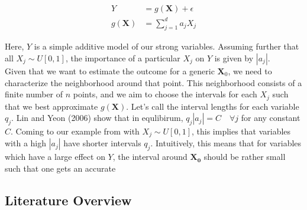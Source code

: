 {\begin{align*}
    Y &= g(\mathbf{X}) + \epsilon \\
    g(\mathbf{X}) &= \sum_{j=1}^d a_j X_j
\end{align*}

Here, $Y$ is a simple additive model of our strong variables. 
Assuming further that all $X_j \sim U[0, 1]$, the importance of a particular $X_j$ on $Y$ is given by $|a_j|$. \\

Given that we want to estimate the outcome for a generic $\mathbf{X}_0$, we need to characterize the neighborhood around that point. This neighborhood consists of a finite number of $n$ points, and we aim to choose the intervals for each $X_j$ such that we best approximate $g(\mathbf{X})$. Let's call the interval lengths for each variable $q_j$. Lin and Yeon (2006) show that in equlibirum, $q_j |a_j| = C \quad \forall j$ for any constant $C$. Coming to our example from with $X_j \sim U[0, 1]$, this implies that variables with a high $|a_j|$ have shorter intervals $q_j$. Intuitively, this means that for variables which have a large effect on $Y$, the interval around $\mathbf{X_0}$ should be rather small such that one gets an accurate 


\subsection{Literature Overview}

}

